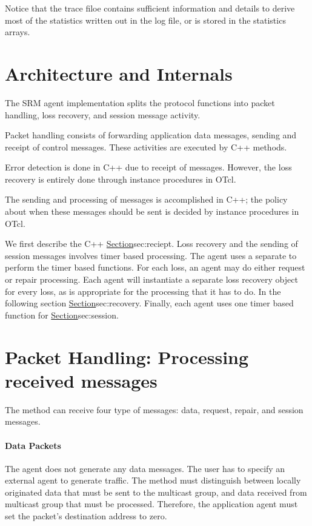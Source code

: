 {Notice that the trace filoe contains sufficient information and details
to derive most of the statistics written out in the log file, or
is stored in the statistics arrays.

\section{Architecture and Internals}
\label{sec:architecture}

The SRM agent implementation splits the protocol functions
into packet handling, loss recovery, and session message activity.
\begin{list}{}{}
\item  Packet handling consists of forwarding application data messages,
  sending and receipt of control messages.
  These activities are executed by C++ methods.
\item  Error detection is done in C++ due to receipt of messages.
  However, the loss recovery is entirely done through 
  instance procedures in OTcl.
\item  The sending and processing of messages is accomplished in C++;
  the policy about when these messages should be sent is decided
  by instance procedures in OTcl.
\end{list}
We first describe the C++
\href{processing due to receipt of messages}{Section}{sec:reciept}.
Loss recovery and the sending of session messages involves
timer based processing.
The agent uses a separate 
to perform the timer based functions.
For each loss, an agent may do either request or repair processing.
Each agent will instantiate a separate loss recovery object
for every loss, as is appropriate for the processing that it has to do.
In the following section
\href{we describe the basic timer based functions and
the loss recovery mechanisms}{Section}{sec:recovery}.
Finally, each agent uses one timer based function
for \href{sending periodic session messages}{Section}{sec:session}.

\section{Packet Handling: Processing received messages}
\label{sec:reciept}

The
method can receive four type of messages:
data, request, repair, and session messages.

\paragraph{Data Packets}
The agent does not generate any data messages.
The user has to specify an external agent to generate traffic.
The  method must distinguish between
locally originated data that must be sent to the multicast group,
and data received from multicast group that must be processed.
Therefore, the application agent must
set the packet's destination address to zero.

}
